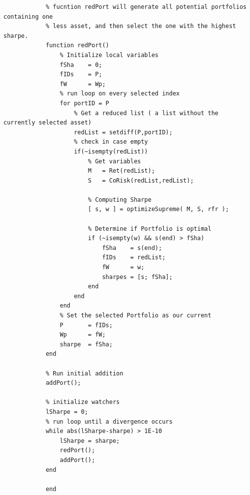 \documentclass[12pt,titlepage,letter]{article}
\begin{document}
\begin{verbatim}
			% fucntion redPort will generate all potential portfolios containing one
			% less asset, and then select the one with the highest sharpe.
			function redPort()
			    % Initialize local variables
			    fSha    = 0;
			    fIDs    = P;
			    fW      = Wp;
			    % run loop on every selected index
			    for portID = P
			        % Get a reduced list ( a list without the currently selected asset)
			        redList = setdiff(P,portID);
			        % check in case empty
			        if(~isempty(redList))
			            % Get variables
			            M   = Ret(redList);
			            S   = CoRisk(redList,redList);

			            % Computing Sharpe
			            [ s, w ] = optimizeSupreme( M, S, rfr );

			            % Determine if Portfolio is optimal
			            if (~isempty(w) && s(end) > fSha)
			                fSha    = s(end);
			                fIDs    = redList;
			                fW      = w;
			                sharpes = [s; fSha];
			            end
			        end
			    end
			    % Set the selected Portfolio as our current
			    P       = fIDs;
			    Wp      = fW;
			    sharpe  = fSha;
			end

			% Run initial addition
			addPort();

			% initialize watchers
			lSharpe = 0;
			% run loop until a divergence occurs
			while abs(lSharpe-sharpe) > 1E-10
			    lSharpe = sharpe;
			    redPort();
			    addPort();
			end

			end
		\end{verbatim}
\end{document}
